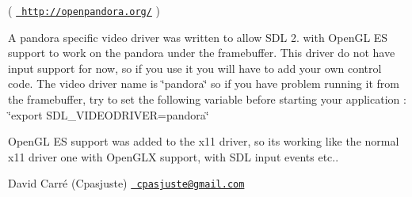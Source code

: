( \href{http://openpandora.org/}{\texttt{ http\+://openpandora.\+org/}} )
\begin{DoxyItemize}
\item A pandora specific video driver was written to allow SDL 2. with Open\+GL ES support to work on the pandora under the framebuffer. This driver do not have input support for now, so if you use it you will have to add your own control code. The video driver name is \char`\"{}pandora\char`\"{} so if you have problem running it from the framebuffer, try to set the following variable before starting your application \+: \char`\"{}export SDL\+\_\+\+VIDEODRIVER=pandora\char`\"{}
\item Open\+GL ES support was added to the x11 driver, so it\textquotesingle{}s working like the normal x11 driver one with Open\+GLX support, with SDL input event\textquotesingle{}s etc..
\end{DoxyItemize}

David Carré (Cpasjuste) \href{mailto:cpasjuste@gmail.com}{\texttt{ cpasjuste@gmail.\+com}} 